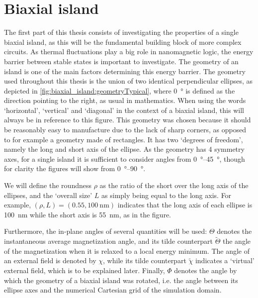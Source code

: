 \documentclass[11pt,a4paper,english]{article}
\begin{document}
\section{Biaxial island}
\label{par:Biaxial_island}
The first part of this thesis consists of investigating the properties of a single biaxial island, as this will be the fundamental building block of more complex circuits. As thermal fluctuations play a big role in nanomagnetic logic, the energy barrier between stable states is important to investigate. The geometry of an island is one of the main factors determining this energy barrier. The geometry used throughout this thesis is the union of two identical perpendicular ellipses, as depicted in \cref{fig:biaxial_island:geometryTypical}, where \SI{0}{\degree} is defined as the direction pointing to the right, as usual in mathematics. When using the words `horizontal', `vertical' and `diagonal' in the context of a biaxial island, this will always be in reference to this figure. This geometry was chosen because it should be reasonably easy to manufacture due to the lack of sharp corners, as opposed to for example a geometry made of rectangles. It has two `degrees of freedom', namely the long and short axis of the ellipse. As the geometry has 4 symmetry axes, for a single island it is sufficient to consider angles from \SIrange{0}{45}{\degree}, though for clarity the figures will show from \SIrange{0}{90}{\degree}. \par
We will define the roundness $\rho$ as the ratio of the short over the long axis of the ellipses, and the `overall size' $L$ as simply being equal to the long axis. For example, $(\rho, L)=(0.55, \SI{100}{\nano\metre})$ indicates that the long axis of each ellipse is \SI{100}{\nano\metre} while the short axis is \SI{55}{\nano\metre}, as in the figure. \par
Furthermore, the in-plane angles of several quantities will be used: $\Theta$ denotes the instantaneous average magnetization angle, and its tilde counterpart $\widetilde{\Theta}$ the angle of the magnetization when it is relaxed to a local energy minimum. The angle of an external field is denoted by $\chi$, while its tilde counterpart $\widetilde{\chi}$ indicates a `virtual' external field, which is to be explained later. Finally, $\Phi$ denotes the angle by which the geometry of a biaxial island was rotated, i.e. the angle between its ellipse axes and the numerical Cartesian grid of the simulation domain.
\end{document}

